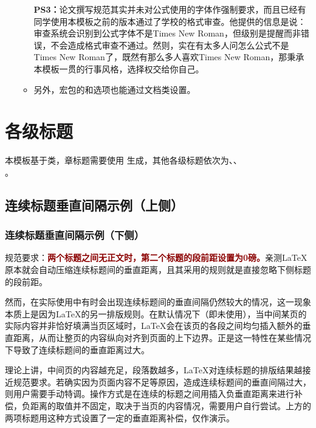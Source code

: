 \documentclass[print, doctor, vlined]{DissertUESTC}
\begin{document}
\begin{itemize}
\begin{itemize}
			\textbf{PS3：}论文撰写规范其实并未对公式使用的字体作强制要求，而且已经有同学使用本模板之前的版本通过了学校的格式审查。他提供的信息是说：审查系统会识别到公式字体不是Times New Roman，但级别是提醒而非错误，不会造成格式审查不通过。然则，实在有太多人问怎么公式不是Times New Roman了，既然有那么多人喜欢Times New Roman，那秉承本模板一贯的行事风格，选择权交给你自己。

			\item 另外，\href{https://mirrors.sustech.edu.cn/CTAN/macros/latex/contrib/algorithm2e/doc/algorithm2e.pdf}{}宏包的和选项也能通过文档类设置。
		\end{itemize}
	\end{itemize}
	
	\section{各级标题}
	
	本模板基于类，章标题需要使用 生成，其他各级标题依次为、、\\ 。

	\subsection{连续标题垂直间隔示例（上侧）}\vspace*{-10bp}
	\subsubsection{连续标题垂直间隔示例（下侧）}

	规范要求：\textbf{\textcolor{DarkRed}{两个标题之间无正文时，第二个标题的段前距设置为0磅。}}亲测LaTeX原本就会自动压缩连续标题间的垂直距离，且其采用的规则就是直接忽略下侧标题的段前距。
	
	然而，在实际使用中有时会出现连续标题间的垂直间隔仍然较大的情况，这一现象本质上是因为LaTeX的另一排版规则。在默认情况下（即未使用），当中间某页的实际内容并非恰好填满当页区域时，LaTeX会在该页的各段之间均匀插入额外的垂直距离，从而让整页的内容纵向对齐到页面的上下边界。正是这一特性在某些情况下导致了连续标题间的垂直距离过大。

	理论上讲，中间页的内容越充足，段落数越多，LaTeX对连续标题的排版结果越接近规范要求。若确实因为页面内容不足等原因，造成连续标题间的垂直间隔过大，则用户需要手动特调。操作方式是在连续的标题之间用插入负垂直距离来进行补偿，负距离的取值并不固定，取决于当页的内容情况，需要用户自行尝试。上方的两项标题用这种方式设置了一定的垂直距离补偿，仅作演示。
	
\end{document}
